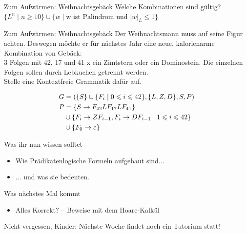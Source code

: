 {\begin{frame}{Zum Aufwärmen: Weihnachtsgebäck}
	Welche Kombinationen sind gültig?\\[0.5em] \pause
	$\{ L^n \mid n \geq 10\} \cup \{w \mid \text{w ist Palindrom und } |w|_L \leq 1\}$
\end{frame}

\begin{frame}{Zum Aufwärmen: Weihnachtsgebäck}
	Der Weihnachtsmann muss auf seine Figur achten. Deswegen möchte er für nächstes Jahr eine neue, kalorienarme Kombination von Gebäck:\\
	3 Folgen mit 42, 17 und 41 x ein Zimtstern oder ein Dominostein. Die einzelnen Folgen sollen durch Lebkuchen getrennt werden.\\
	Stelle eine Kontextfreie Grammatik dafür auf.
	
	\pause
	\begin{align*}
		G &= (\{S\} \cup \{F_i \mid 0 \leqslant i \leqslant 42 \}, \{L, Z, D\}, S, P)\\
		P &= \{S \to F_{42}LF_{17}LF_{41} \}\\
		  &\cup \{F_i \to ZF_{i-1}, F_i \to DF_{i-1} \mid 1 \leqslant i \leqslant 42 \} \\
		  &\cup \{F_0 \to \varepsilon \}
	\end{align*}
\end{frame}
}




\begin{frame}	
	\begin{block}{Was ihr nun wissen solltet}
		\begin{itemize}
			\item Wie Prädikatenlogische Formeln aufgebaut sind...
			\item ... und was sie bedeuten.
		\end{itemize}
	\end{block}
	
	\begin{block}{Was nächstes Mal kommt}
		\begin{itemize}
			\item Alles Korrekt? – Beweise mit dem Hoare-Kalkül
		\end{itemize}
	\end{block}
\end{frame}

\begin{frame}[plain]
	\begin{center}
		\large
		Nicht vergessen, Kinder: Nächste Woche findet noch ein Tutorium statt! \smiley
	\end{center}
\end{frame}

\slideThanks

